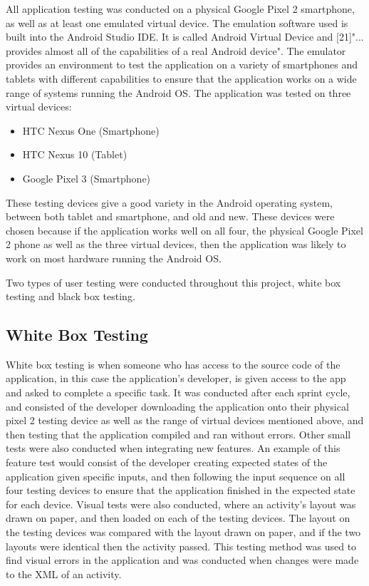 \documentclass{article}
\begin{document}
All application testing was conducted on a physical Google Pixel 2 smartphone, as well as at least one emulated virtual device. The emulation software used is built into the Android Studio IDE. It is called Android Virtual Device and [21]"... provides almost all of the capabilities of a real Android device". The emulator provides an environment to test the application on a variety of smartphones and tablets with different capabilities to ensure that the application works on a wide range of systems running the Android OS. The application was tested on three virtual devices: 

\begin{itemize}
	\item HTC Nexus One (Smartphone)
	\item HTC Nexus 10 (Tablet)
	\item Google Pixel 3 (Smartphone)
\end{itemize}

These testing devices give a good variety in the Android operating system, between both tablet and smartphone, and old and new. These devices were chosen because if the application works well on all four, the physical Google Pixel 2 phone as well as the three virtual devices, then the application was likely to work on most hardware running the Android OS. \par

Two types of user testing were conducted throughout this project, white box testing and black box testing. \par 

\subsection{White Box Testing}

White box testing is when someone who has access to the source code of the application, in this case the application's developer, is given access to the app and asked to complete a specific task. It was conducted after each sprint cycle, and consisted of the developer downloading the application onto their physical pixel 2 testing device as well as the range of virtual devices mentioned above, and then testing that the application compiled and ran without errors. Other small tests were also conducted when integrating new features. An example of this feature test would consist of the developer creating expected states of the application given specific inputs, and then following the input sequence on all four testing devices to ensure that the application finished in the expected state for each device. Visual tests were also conducted, where an activity's layout was drawn on paper, and then loaded on each of the testing devices. The layout on the testing devices was compared with the layout drawn on paper, and if the two layouts were identical then the activity passed. This testing method was used to find visual errors in the application and was conducted when changes were made to the XML of an activity. \par
\end{document}

